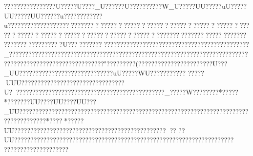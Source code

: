 {{{{{{{{{{{{{{{{{{{{{{{{{{{{{{{{{{{{{{{{{{{{{{{{{{{{{{{{{{{{{{{{{{{{{{{{{{{{{{{{{{{{{{{{{{{{{{{{{{{{{{{{{{{{{{{{{{{{{{{{{{{{{{{{{{{{{{{{{{{{{{{{{{{{{{{{{{{{{{{{{{{{{{{{{{{{{{{{{{{{{{{{{{{{{{{{{{{{{{{{{{{{{{{{{{{{{{{{{{{{{{{{{{{{{{{{{{{{{{{{{{{{{{{{{{{{{{{{{{{{{{{{{{{{{{{{{{{{{{{{{{{{{{{{{{{{{{{{{{{{{{{{{{{{{{{{{{{{{{{{{{{{{{{{{{{{{{{{{{{{{{{{{{{{{{{{{{{{{{{{{{{{{{{{{{{{{{{{{{{{{{{{{{{{{{{{{{{{{{{{{{{{{{{{{{{{{{{{{{{{{{{{{{{{{{{{{{{{{{{{{{{{{{{{{{{{{{{{{{{{{{{{{{{{{{{{{{{{{{{{{{{{{{{{{{{{{{{{{{{{{{{{{{{{{{{{{{{{{{{{{{{{{{{{{{{{{{{{{{{{{{{{{{{{{{{{{{{{{{{{{{{{{{{{{{{{{{{{{{{{{{{{{{{{{{{{{{{{{{{{{{{{{{{{{{{{{{{{{{{{{{{{{{{{{{{{{{{{{{{{{{{{{{{{{{{{{{{{{{{{{{{{{{{{{{{{{{{{{{{{{{{{{{{{{{{{{{{{{{{{{{{{{{{{{{{{{{{{{{{{{{{{{{{{{{{{{{{{{{{{{{{{{{{{{{{{{{{{{{{{{{{{{{{{{{{{{{{{{{{{{{{{{{{{{{{{????? ???????????U?????U????_U??????U?????? ????W_U?????UU?????uU?????UU?????UU??????u????????????u????????????????????????????????????????????????????????????????????????????????????????????????????????????????????????????????????????????????????U????????????????????   ?????  ??????  ?????? ??????????????????_??????????????????????????? ????????????????????????????????????????????????????????????????????????? ?????  "???   ???   ???  (??? ????????????????????U???_UU???  ??????????????????????????uU?????WU???????????
?????UUU??????????????????????????????    ??U??? ????????????????????????????????????????????_?????W????????*?????*???????UU????UU????UU???_UU??  ???? ????? ????????????????????????????????????????????????????????????????????????? *????  *?????UU??????????????????????????????????????????? ??????
   ??UU????  ????????????????????????????????????????????????????????????????
????? ?????  ?????  ?????  
}}}}}}}}}}}}}}}}}}}}}}}}}}}}}}}}}}}}}}}}}}}}}}}}}}}}}}}}}}}}}}}}}}}}}}}}}}}}}}}}}}}}}}}}}}}}}}}}}}}}}}}}}}}}}}}}}}}}}}}}}}}}}}}}}}}}}}}}}}}}}}}}}}}}}}}}}}}}}}}}}}}}}}}}}}}}}}}}}}}}}}}}}}}}}}}}}}}}}}}}}}}}}}}}}}}}}}}}}}}}}}}}}}}}}}}}}}}}}}}}}}}}}}}}}}}}}}}}}}}}}}}}}}}}}}}}}}}}}}}}}}}}}}}}}}}}}}}}}}}}}}}}}}}}}}}}}}}}}}}}}}}}}}}}}}}}}}}}}}}}}}}}}}}}}}}}}}}}}}}}}}}}}}}}}}}}}}}}}}}}}}}}}}}}}}}}}}}}}}}}}}}}}}}}}}}}}}}}}}}}}}}}}}}}}}}}}}}}}}}}}}}}}}}}}}}}}}}}}}}}}}}}}}}}}}}}}}}}}}}}}}}}}}}}}}}}}}}}}}}}}}}}}}}}}}}}}}}}}}}}}}}}}}}}}}}}}}}}}}}}}}}}}}}}}}}}}}}}}}}}}}}}}}}}}}}}}}}}}}}}}}}}}}}}}}}}}}}}}}}}}}}}}}}}}}}}}}}}}}}}}}}}}}}}}}}}}}}}}}}}}}}}}}}}}}}}}}}}}}}}}}}}}}}}}}}}}}}}}}}}}}}}}}}}}}}}}}}}}}}}}}}}}}}}}}}}}}}}}}}}}}}}}}}}}}}}}}}}}}}}}}}}}}}}}}}}}}}}}}}}}}}}}}}}}}}}}}}}}}}}}}}}}}}}}}}}
